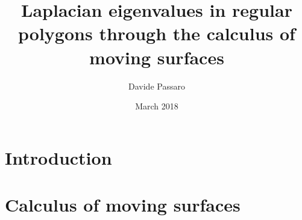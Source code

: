\documentclass{article}
\title{Laplacian eigenvalues in regular polygons through the calculus of moving surfaces}
\author{Davide Passaro}
\date{March 2018}
\theoremstyle{plain}
\theoremstyle{definition}
\theoremstyle{remark}
\begin{document}
\maketitle

\section{Introduction}
    
\section{Calculus of moving surfaces}
    
    
{}

\end{document}

